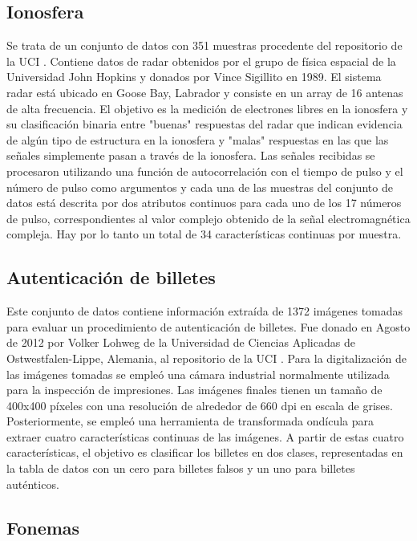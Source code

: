 \subsection{Ionosfera}

Se trata de un conjunto de datos con 351 muestras procedente del repositorio de la UCI \cite{ionosphere-dataset}. Contiene datos de radar obtenidos por el grupo de física espacial de la Universidad John Hopkins y donados por Vince Sigillito en 1989. El sistema radar está ubicado en Goose Bay, Labrador y consiste en un array de 16 antenas de alta frecuencia. El objetivo es la medición de electrones libres en la ionosfera y su clasificación binaria entre "buenas" respuestas del radar que indican evidencia de algún tipo de estructura en la ionosfera y "malas" respuestas en las que las señales simplemente pasan a través de la ionosfera. Las señales recibidas se procesaron utilizando una función de autocorrelación con el tiempo de pulso y el número de pulso como argumentos y cada una de las muestras del conjunto de datos está descrita por dos atributos continuos para cada uno de los 17 números de pulso, correspondientes al valor complejo obtenido de la señal electromagnética compleja. Hay por lo tanto un total de 34 características continuas por muestra.

\subsection{Autenticación de billetes}

Este conjunto de datos contiene información extraída de 1372 imágenes tomadas para evaluar un procedimiento de autenticación de billetes. Fue donado en Agosto de 2012 por Volker Lohweg de la Universidad de Ciencias Aplicadas de Ostwestfalen-Lippe, Alemania, al repositorio de la UCI \cite{banknote-dataset}. Para la digitalización de las imágenes tomadas se empleó una cámara industrial normalmente utilizada para la inspección de impresiones. Las imágenes finales tienen un tamaño de 400x400 píxeles con una resolución de alrededor de 660 dpi en escala de grises. Posteriormente, se empleó una herramienta de transformada ondícula para extraer cuatro características continuas de las imágenes. A partir de estas cuatro características, el objetivo es clasificar los billetes en dos clases, representadas en la tabla de datos con un cero para billetes falsos y un uno para billetes auténticos.

\subsection{Fonemas}

